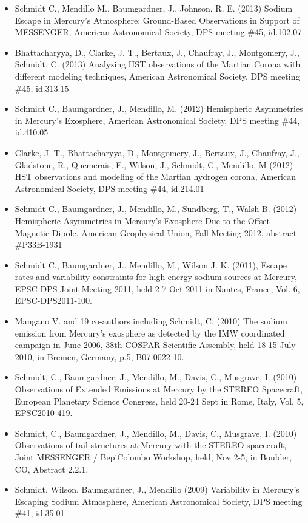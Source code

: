 \documentclass[12pt]{report}
\begin{document}
\begin{itemize}
   \item Schmidt C.,  Mendillo M., Baumgardner, J., Johnson, R. E. (2013) Sodium Escape in Mercury's Atmosphere: Ground-Based Observations in Support of MESSENGER, American Astronomical Society, DPS meeting \#45, id.102.07
   \item Bhattacharyya, D., Clarke, J. T., Bertaux, J., Chaufray, J., Montgomery, J., Schmidt, C. (2013) Analyzing HST observations of the Martian Corona with different modeling techniques, American Astronomical Society, DPS meeting \#45, id.313.15
   \item Schmidt C., Baumgardner, J., Mendillo, M. (2012) Hemispheric Asymmetries in Mercury's Exosphere, American Astronomical Society, DPS meeting \#44, id.410.05
   \item Clarke, J. T., Bhattacharyya, D., Montgomery, J., Bertaux, J., Chaufray, J., Gladstone, R., Quemerais, E., Wilson, J., Schmidt, C., Mendillo, M (2012) HST observations and modeling of the Martian hydrogen corona, American Astronomical Society, DPS meeting \#44, id.214.01
   \item Schmidt C., Baumgardner, J., Mendillo, M., Sundberg, T., Walsh B. (2012) Hemispheric Asymmetries in Mercury's Exosphere Due to the Offset Magnetic Dipole, American Geophysical Union, Fall Meeting 2012, abstract \#P33B-1931
   \item Schmidt C., Baumgardner, J., Mendillo, M., Wilson J. K. (2011), Escape rates and variability constraints for high-energy sodium sources at Mercury, EPSC-DPS Joint Meeting 2011, held 2-7 Oct 2011 in Nantes, France, Vol. 6, EPSC-DPS2011-100.
   \item Mangano V. and 19 co-authors including Schmidt, C. (2010) The sodium emission from Mercury's exosphere as detected by the IMW coordinated campaign in June 2006, 38th COSPAR Scientific Assembly, held 18-15 July 2010, in Bremen, Germany, p.5, B07-0022-10. 
   \item Schmidt, C., Baumgardner, J., Mendillo, M., Davis, C., Musgrave, I. (2010) Observations of Extended Emissions at Mercury by the STEREO Spacecraft, European Planetary Science Congress, held 20-24 Sept in Rome, Italy, Vol. 5, EPSC2010-419.
   \item Schmidt, C., Baumgardner, J., Mendillo, M., Davis, C., Musgrave, I. (2010) Observations of tail structures at Mercury with the STEREO spacecraft, Joint MESSENGER / BepiColombo Workshop, held, Nov 2-5, in Boulder, CO, Abstract 2.2.1. 
   \item Schmidt, Wilson, Baumgardner, J., Mendillo (2009) Variability in Mercury's Escaping Sodium Atmosphere, American Astronomical Society, DPS meeting \#41, id.35.01

\end{itemize}
\end{document}
